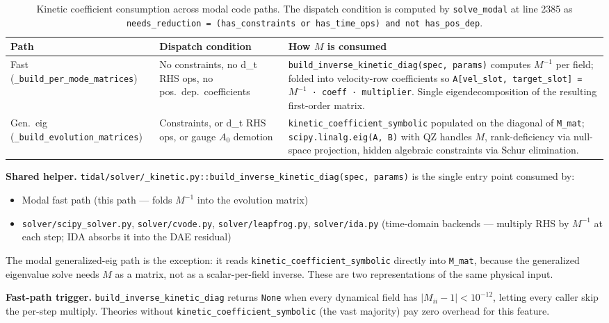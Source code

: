\begin{table}[htbp]
\centering
\caption{Kinetic coefficient consumption across modal code paths. The dispatch condition is computed by \texttt{solve\_modal} at line 2385 as \texttt{needs\_reduction = (has\_constraints or has\_time\_ops) and not has\_pos\_dep}.}
\label{tab:modal-kinetic-dispatch}
\begin{tabular}{@{}p{}p{}p{}@{}}
\toprule
Path & Dispatch condition & How $M$ is consumed \\
\midrule
Fast (\texttt{\_build\_per\_mode\_matrices}) & No constraints, no d\_t RHS ops, no pos.\ dep.\ coefficients & \texttt{build\_inverse\_kinetic\_diag(spec, params)} computes $M^{-1}$ per field; folded into velocity-row coefficients so \texttt{A[vel\_slot, target\_slot] = $M^{-1}$ · coeff · multiplier}. Single eigendecomposition of the resulting first-order matrix. \\
Gen.\ eig (\texttt{\_build\_evolution\_matrices}) & Constraints, or d\_t RHS ops, or gauge $A_0$ demotion & \texttt{kinetic\_coefficient\_symbolic} populated on the diagonal of \texttt{M\_mat}; \texttt{scipy.linalg.eig(A, B)} with QZ handles $M$, rank-deficiency via null-space projection, hidden algebraic constraints via Schur elimination. \\
\bottomrule
\end{tabular}
\end{table}

\textbf{Shared helper.} \texttt{tidal/solver/\_kinetic.py::build\_inverse\_kinetic\_diag(spec, params)} is the single entry point consumed by:
\begin{itemize}
  \item Modal fast path (this path --- folds $M^{-1}$ into the evolution matrix)
  \item \texttt{solver/scipy\_solver.py}, \texttt{solver/cvode.py}, \texttt{solver/leapfrog.py}, \texttt{solver/ida.py} (time-domain backends --- multiply RHS by $M^{-1}$ at each step; IDA absorbs it into the DAE residual)
\end{itemize}
The modal generalized-eig path is the exception: it reads \texttt{kinetic\_coefficient\_symbolic} directly into \texttt{M\_mat}, because the generalized eigenvalue solve needs $M$ as a matrix, not as a scalar-per-field inverse. These are two representations of the same physical input.

\textbf{Fast-path trigger.} \texttt{build\_inverse\_kinetic\_diag} returns \texttt{None} when every dynamical field has $|M_{ii} - 1| < 10^{-12}$, letting every caller skip the per-step multiply. Theories without \texttt{kinetic\_coefficient\_symbolic} (the vast majority) pay zero overhead for this feature.


